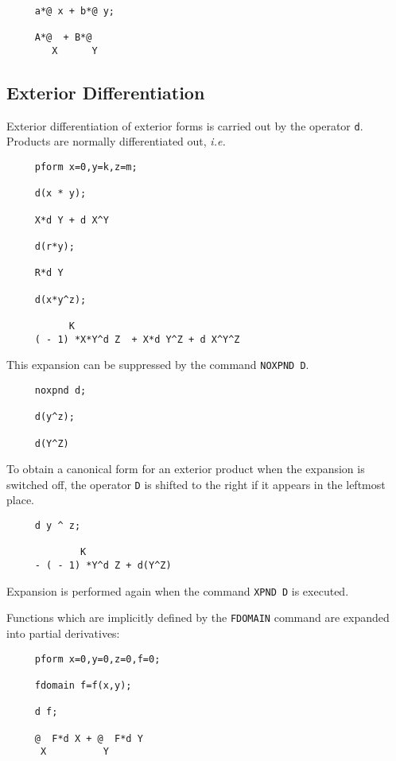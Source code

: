 \example{}

\begin{verbatim}
     a*@ x + b*@ y;

     A*@  + B*@
        X      Y
\end{verbatim}

\subsection{Exterior Differentiation}
Exterior differentiation of exterior forms is carried out by the
operator {\tt d}\label{d}.  Products are normally differentiated out,
{\em i.e.}

\begin{verbatim}
     pform x=0,y=k,z=m;

     d(x * y);

     X*d Y + d X^Y

     d(r*y);

     R*d Y

     d(x*y^z);

           K
     ( - 1) *X*Y^d Z  + X*d Y^Z + d X^Y^Z
\end{verbatim}

This expansion can be suppressed by the command {\tt NOXPND D}\label{NOXPNDD}.

\begin{verbatim}
     noxpnd d;

     d(y^z);

     d(Y^Z)
\end{verbatim}

To obtain a canonical form for an exterior product when the expansion
is switched off, the operator {\tt D} is shifted to the right if it
appears in the leftmost place.

\begin{verbatim}
     d y ^ z;

             K
     - ( - 1) *Y^d Z + d(Y^Z)
\end{verbatim}

Expansion is performed again when the command {\tt XPND D}\label{XPNDD}
is executed. 

Functions which are implicitly defined by the {\tt FDOMAIN} command are
expanded into partial derivatives:

\begin{verbatim}
     pform x=0,y=0,z=0,f=0;

     fdomain f=f(x,y);

     d f;

     @  F*d X + @  F*d Y
      X          Y
\end{verbatim}

